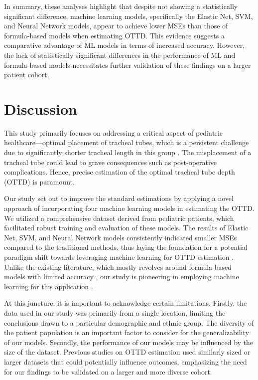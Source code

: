 \documentclass[11pt]{article}
\begin{document}
In summary, these analyses highlight that despite not showing a statistically significant difference, machine learning models, specifically the Elastic Net, SVM, and Neural Network models, appear to achieve lower MSEs than those of formula-based models when estimating OTTD. This evidence suggests a comparative advantage of ML models in terms of increased accuracy. However, the lack of statistically significant differences in the performance of ML and formula-based models necessitates further validation of these findings on a larger patient cohort.

\section*{Discussion}

This study primarily focuses on addressing a critical aspect of pediatric healthcare—optimal placement of tracheal tubes, which is a persistent challenge due to significantly shorter tracheal length in this group \cite{Uya2020PointofCareUI, Rost2022TrachealTM}. The misplacement of a tracheal tube could lead to grave consequences such as post-operative complications. Hence, precise estimation of the optimal tracheal tube depth (OTTD) is paramount.

Our study set out to improve the standard estimations by applying a novel approach of incorporating four machine learning models in estimating the OTTD. We utilized a comprehensive dataset derived from pediatric patients, which facilitated robust training and evaluation of these models. The results of Elastic Net, SVM, and Neural Network models consistently indicated smaller MSEs compared to the traditional methods, thus laying the foundation for a potential paradigm shift towards leveraging machine learning for OTTD estimation \cite{Dunn2020BenchmarkingMP, Huang2023Photonics}. Unlike the existing literature, which mostly revolves around formula-based models with limited accuracy \cite{Nguyen2016AccuracyOA, Faigle2015NovelSP}, our study is pioneering in employing machine learning for this application \cite{Dial2001PediatricSF}.

At this juncture, it is important to acknowledge certain limitations. Firstly, the data used in our study was primarily from a single location, limiting the conclusions drawn to a particular demographic and ethnic group. The diversity of the patient population is an important factor to consider for the generalizability of our models. Secondly, the performance of our models may be influenced by the size of the dataset. Previous studies \cite{Nguyen2016AccuracyOA, Faigle2015NovelSP} on OTTD estimation used similarly sized or larger datasets that could potentially influence outcomes, emphasizing the need for our findings to be validated on a larger and more diverse cohort.
\end{document}
